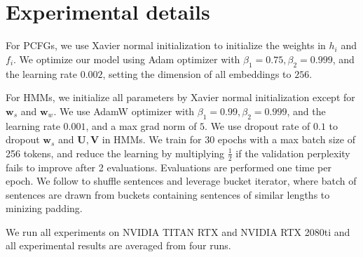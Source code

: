 \documentclass[11pt]{article}
\begin{document}
\section{Experimental details}
\label{appd:exp}
For PCFGs, we use Xavier normal initialization to initialize the weights in $h_i$ and $f_i$. We optimize our model using Adam optimizer with $\beta_1 = 0.75, \beta_2 = 0.999$, and the learning rate $0.002$, setting the dimension of all embeddings to $256$. 

For HMMs, we initialize all parameters by Xavier normal initialization except for $\mathbf{w}_s$ and $\mathbf{w}_w$. We use AdamW optimizer with $\beta_1 = 0.99, \beta_2 = 0.999$, and the learning rate $0.001$, and a max grad norm of $5$. We use dropout rate of $0.1$ to dropout $\mathbf{w}_s$ and $\mathbf{U},\mathbf{V}$ in HMMs. We train for 30 epochs with a max batch size of 256 tokens, and reduce the learning by multiplying $\frac{1}{2}$ if the validation perplexity fails to improve after 2 evaluations. Evaluations are performed one time per epoch. We follow \citet{chiu2021low} to shuffle sentences and leverage bucket iterator, where batch of sentences are drawn from buckets containing sentences of similar lengths to minizing padding.

We run all experiments on NVIDIA TITAN RTX and NVIDIA RTX 2080ti and all experimental results are averaged from four runs. 
\end{document}
